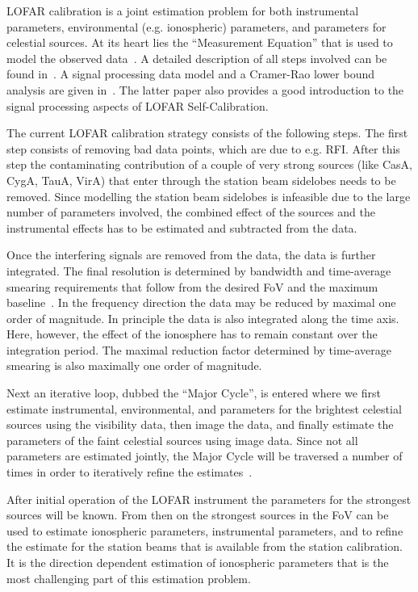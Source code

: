 \documentclass[journal]{IEEEtran}
\begin{document}
LOFAR calibration is a joint estimation problem for both instrumental parameters, environmental (e.g. ionospheric) parameters, and parameters for celestial sources. At its heart lies the ``Measurement Equation'' that is used to model the observed data~\cite{Hamaker:96}. A detailed description of all steps involved can be found in~\cite{Noordam:06}. A signal processing data model and a Cramer-Rao lower bound analysis are given in~\cite{Tol:07}. The latter paper also provides a good introduction to the signal processing aspects of LOFAR Self-Calibration.   

\label{sec:RFI}
The current LOFAR calibration strategy consists of the following steps. The first step consists of removing bad data points, which are due to e.g. RFI. After this step the contaminating contribution of a couple of very strong sources (like CasA, CygA, TauA, VirA) that enter through the station beam sidelobes needs to be removed. Since modelling the station beam sidelobes is infeasible due to the large number of parameters involved, the combined effect of the sources and the instrumental effects has to be estimated and subtracted from the data. 

Once the interfering signals are removed from the data, the data is further integrated. The final resolution is determined by bandwidth and time-average smearing requirements that follow from the desired FoV and the maximum baseline~\cite{SIRAII:99}. In the frequency direction the data may be reduced by maximal one order of magnitude. In principle the data is also integrated along the time axis. Here, however, the effect of the ionosphere has to remain constant over the integration period. The maximal reduction factor determined by time-average smearing is also maximally one order of magnitude.

Next an iterative loop, dubbed the ``Major Cycle'', is entered where we first estimate instrumental, environmental, and parameters for the brightest celestial sources using the visibility data, then image the data, and finally estimate  the parameters of the faint celestial sources using image data. Since not all parameters are estimated jointly, the Major Cycle will be traversed a number of times in order to iteratively refine the estimates~\cite{Noordam:06,Nijboer:07}. 

After initial operation of the LOFAR instrument the parameters for the strongest sources will be known. From then on the strongest sources in the FoV can be used to estimate ionospheric parameters, instrumental parameters, and to refine the estimate for the station beams that is available from the station calibration. It is the direction dependent estimation of ionospheric parameters that is the most challenging part of this estimation problem. 
\end{document}
